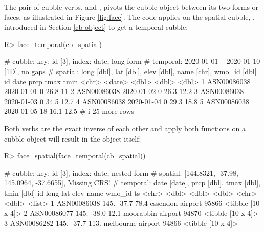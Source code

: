 \documentclass[
  shortnames]{jss}
\begin{document}
The pair of cubble verbs,  and , pivots the cubble object between its two forms or faces, as illustrated in Figure \ref{fig:face}. The code applies  on the spatial cubble, , introduced in Section \ref{cb-object} to get a temporal cubble:

\begin{CodeChunk}
\begin{CodeInput}
R> face_temporal(cb_spatial)
\end{CodeInput}
\begin{CodeOutput}
# cubble:   key: id [3], index: date, long form
# temporal: 2020-01-01 -- 2020-01-10 [1D], no gaps
# spatial:  long [dbl], lat [dbl], elev [dbl], name [chr], wmo_id [dbl]
  id          date        prcp  tmax  tmin
  <chr>       <date>     <dbl> <dbl> <dbl>
1 ASN00086038 2020-01-01     0  26.8  11  
2 ASN00086038 2020-01-02     0  26.3  12.2
3 ASN00086038 2020-01-03     0  34.5  12.7
4 ASN00086038 2020-01-04     0  29.3  18.8
5 ASN00086038 2020-01-05    18  16.1  12.5
# i 25 more rows
\end{CodeOutput}
\end{CodeChunk}

Both verbs are the exact inverse of each other and apply both functions on a cubble object will result in the object itself:

\begin{CodeChunk}
\begin{CodeInput}
R> face_spatial(face_temporal(cb_spatial))
\end{CodeInput}
\begin{CodeOutput}
# cubble:   key: id [3], index: date, nested form
# spatial:  [144.8321, -37.98, 145.0964, -37.6655], Missing CRS!
# temporal: date [date], prcp [dbl], tmax [dbl], tmin [dbl]
  id           long   lat  elev name              wmo_id ts               
  <chr>       <dbl> <dbl> <dbl> <chr>              <dbl> <list>           
1 ASN00086038  145. -37.7  78.4 essendon airport   95866 <tibble [10 x 4]>
2 ASN00086077  145. -38.0  12.1 moorabbin airport  94870 <tibble [10 x 4]>
3 ASN00086282  145. -37.7 113.  melbourne airport  94866 <tibble [10 x 4]>
\end{CodeOutput}
\end{CodeChunk}
\end{document}
